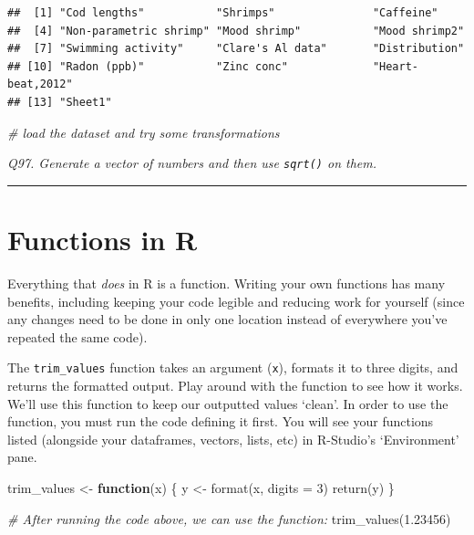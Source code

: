 \documentclass[
  11pt,
  a4paper,
]{book}
\newenvironment{Shaded}{\begin{snugshade}}{\end{snugshade}}
\newcommand{\AttributeTok}[1]{\textcolor[rgb]{0.77,0.63,0.00}{#1}}
\newcommand{\CommentTok}[1]{\textcolor[rgb]{0.56,0.35,0.01}{\textit{#1}}}
\newcommand{\ControlFlowTok}[1]{\textcolor[rgb]{0.13,0.29,0.53}{\textbf{#1}}}
\newcommand{\DecValTok}[1]{\textcolor[rgb]{0.00,0.00,0.81}{#1}}
\newcommand{\FloatTok}[1]{\textcolor[rgb]{0.00,0.00,0.81}{#1}}
\newcommand{\FunctionTok}[1]{\textcolor[rgb]{0.00,0.00,0.00}{#1}}
\newcommand{\NormalTok}[1]{#1}
\newcommand{\OtherTok}[1]{\textcolor[rgb]{0.56,0.35,0.01}{#1}}
\begin{document}
\begin{verbatim}
##  [1] "Cod lengths"           "Shrimps"               "Caffeine"             
##  [4] "Non-parametric shrimp" "Mood shrimp"           "Mood shrimp2"         
##  [7] "Swimming activity"     "Clare's Al data"       "Distribution"         
## [10] "Radon (ppb)"           "Zinc conc"             "Heart-beat,2012"      
## [13] "Sheet1"
\end{verbatim}

\begin{Shaded}
\begin{Highlighting}[]
\CommentTok{\# load the dataset and try some transformations}
\end{Highlighting}
\end{Shaded}

\emph{Q97. Generate a vector of numbers and then use \texttt{sqrt()} on them.}

\begin{center}\rule{0.5\linewidth}{0.5pt}\end{center}

\hypertarget{functions-in-r}{%
\section{Functions in R}\label{functions-in-r}}

Everything that \emph{does} in R is a function. Writing your own functions has many benefits, including keeping your code legible and reducing work for yourself (since any changes need to be done in only one location instead of everywhere you've repeated the same code).

The \texttt{trim\_values} function takes an argument (\texttt{x}), formats it to three digits, and returns the formatted output. Play around with the function to see how it works. We'll use this function to keep our outputted values `clean'. In order to use the function, you must run the code defining it first. You will see your functions listed (alongside your dataframes, vectors, lists, etc) in R-Studio's `Environment' pane.

\begin{Shaded}
\begin{Highlighting}[]
\NormalTok{trim\_values }\OtherTok{\textless{}{-}} \ControlFlowTok{function}\NormalTok{(x) \{}
\NormalTok{  y }\OtherTok{\textless{}{-}} \FunctionTok{format}\NormalTok{(x, }\AttributeTok{digits =} \DecValTok{3}\NormalTok{)}
  \FunctionTok{return}\NormalTok{(y)}
\NormalTok{\} }

\CommentTok{\# After running the code above, we can use the function:}
\FunctionTok{trim\_values}\NormalTok{(}\FloatTok{1.23456}\NormalTok{)}
\end{Highlighting}
\end{Shaded}
\end{document}
